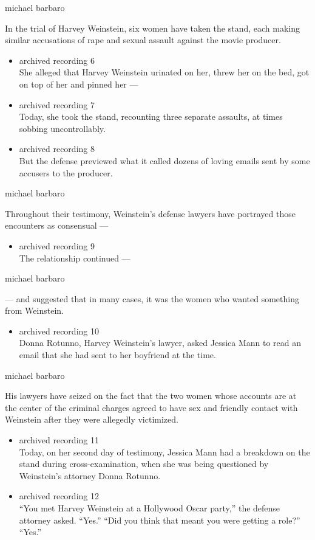 michael barbaro

In the trial of Harvey Weinstein, six women have taken the stand, each
making similar accusations of rape and sexual assault against the movie
producer.

\begin{itemize}
\item
  archived recording 6\\
  She alleged that Harvey Weinstein urinated on her, threw her on the
  bed, got on top of her and pinned her ---
\item
  archived recording 7\\
  Today, she took the stand, recounting three separate assaults, at
  times sobbing uncontrollably.
\item
  archived recording 8\\
  But the defense previewed what it called dozens of loving emails sent
  by some accusers to the producer.
\end{itemize}

michael barbaro

Throughout their testimony, Weinstein's defense lawyers have portrayed
those encounters as consensual ---

\begin{itemize}
\tightlist
\item
  archived recording 9\\
  The relationship continued ---
\end{itemize}

michael barbaro

--- and suggested that in many cases, it was the women who wanted
something from Weinstein.

\begin{itemize}
\tightlist
\item
  archived recording 10\\
  Donna Rotunno, Harvey Weinstein's lawyer, asked Jessica Mann to read
  an email that she had sent to her boyfriend at the time.
\end{itemize}

michael barbaro

His lawyers have seized on the fact that the two women whose accounts
are at the center of the criminal charges agreed to have sex and
friendly contact with Weinstein after they were allegedly victimized.

\begin{itemize}
\item
  archived recording 11\\
  Today, on her second day of testimony, Jessica Mann had a breakdown on
  the stand during cross-examination, when she was being questioned by
  Weinstein's attorney Donna Rotunno.
\item
  archived recording 12\\
  ``You met Harvey Weinstein at a Hollywood Oscar party,'' the defense
  attorney asked. ``Yes.'' ``Did you think that meant you were getting a
  role?'' ``Yes.''
\end{itemize}

